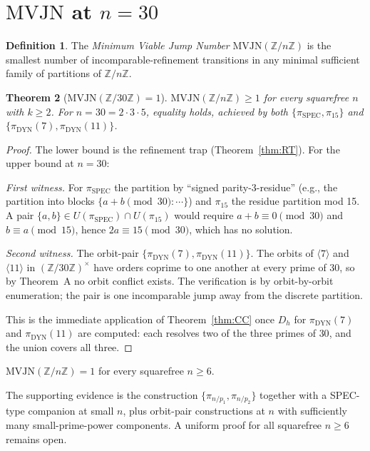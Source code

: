 \documentclass[11pt,reqno]{amsart}
\theoremstyle{plain}
\newtheorem{theorem}{Theorem}
\theoremstyle{definition}
\newtheorem{definition}[theorem]{Definition}
\newcommand{\Z}{\mathbb{Z}}
\newcommand{\Zn}{\Z/n\Z}
\newcommand{\DYN}{\mathrm{DYN}}
\newcommand{\SPEC}{\mathrm{SPEC}}
\begin{document}
\section{$\mathrm{MVJN}$ at $n = 30$} \label{sec:mvjn}

\begin{definition}
The \emph{Minimum Viable Jump Number} $\mathrm{MVJN}(\Zn)$ is the
smallest number of incomparable-refinement transitions in any minimal
sufficient family of partitions of $\Zn$.
\end{definition}

\begin{theorem}[$\mathrm{MVJN}(\Z/30\Z) = 1$] \label{thm:MVJN}
$\mathrm{MVJN}(\Zn) \geq 1$ for every squarefree $n$ with $k \geq 2$.
For $n = 30 = 2 \cdot 3 \cdot 5$, equality holds, achieved by both
$\{\pi_{\SPEC}, \pi_{15}\}$ and $\{\pi_{\DYN}(7), \pi_{\DYN}(11)\}$.
\end{theorem}

\begin{proof}
The lower bound is the refinement trap (Theorem~\ref{thm:RT}). For the
upper bound at $n = 30$:

\emph{First witness.} For $\pi_{\SPEC}$ the partition by ``signed
parity-3-residue'' (e.g., the partition into blocks $\{a + b \pmod{30} : \cdots\}$)
and $\pi_{15}$ the residue partition mod 15. A pair $\{a, b\} \in U(\pi_{\SPEC}) \cap U(\pi_{15})$
would require $a + b \equiv 0 \pmod{30}$ and $b \equiv a \pmod{15}$,
hence $2a \equiv 15 \pmod{30}$, which has no solution.

\emph{Second witness.} The orbit-pair $\{\pi_{\DYN}(7), \pi_{\DYN}(11)\}$.
The orbits of $\langle 7 \rangle$ and $\langle 11 \rangle$ in
$(\Z/30\Z)^{\times}$ have orders coprime to one another at every
prime of $30$, so by Theorem~A no orbit conflict exists. The
verification is by orbit-by-orbit enumeration; the pair is one
incomparable jump away from the discrete partition.

This is the immediate application of Theorem~\ref{thm:CC} once $D_h$
for $\pi_{\DYN}(7)$ and $\pi_{\DYN}(11)$ are computed: each resolves
two of the three primes of $30$, and the union covers all three.
\end{proof}

\begin{conjecture} \label{conj:MVJN}
$\mathrm{MVJN}(\Zn) = 1$ for every squarefree $n \geq 6$.
\end{conjecture}

The supporting evidence is the construction
$\{\pi_{n/p_1}, \pi_{n/p_2}\}$ together with a SPEC-type companion at
small $n$, plus orbit-pair constructions at $n$ with sufficiently
many small-prime-power components. A uniform proof for all
squarefree $n \geq 6$ remains open.
\end{document}

